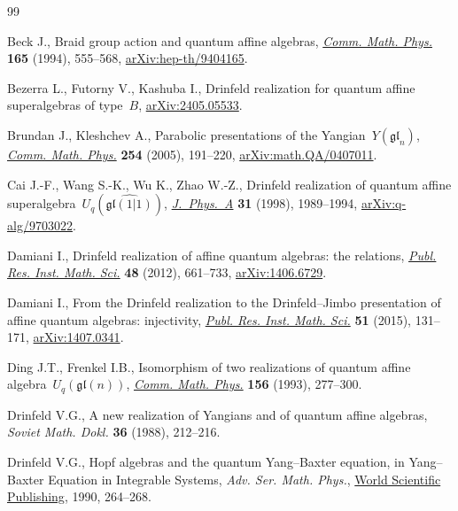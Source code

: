 \begin{thebibliography}{99}
\footnotesize\itemsep=0pt

Beck J., Braid group action and quantum affine algebras, \href{https://doi.org/10.1007/BF02099423}{\textit{Comm. Math.
 Phys.}} \textbf{165} (1994), 555--568, \href{https://arxiv.org/abs/hep-th/9404165}{arXiv:hep-th/9404165}.

Bezerra L., Futorny V., Kashuba I., Drinfeld realization for quantum affine
 superalgebras of type~{$B$}, \href{https://arxiv.org/abs/2405.05533}{arXiv:2405.05533}.

Brundan J., Kleshchev A., Parabolic presentations of the
 {Y}angian~{$Y({\mathfrak{gl}}_n)$}, \href{https://doi.org/10.1007/s00220-004-1249-6}{\textit{Comm. Math. Phys.}} \textbf{254}
 (2005), 191--220, \href{https://arxiv.org/abs/math.QA/0407011}{arXiv:math.QA/0407011}.

Cai J.-F., Wang S.-K., Wu K., Zhao W.-Z., Drinfeld realization of quantum affine
 superalgebra~{$U_q(\widehat{\mathfrak{gl}(1|1)})$}, \href{https://doi.org/10.1088/0305-4470/31/8/011}{\textit{J.~Phys.~A}}
 \textbf{31} (1998), 1989--1994, \href{https://arxiv.org/abs/q-alg/9703022}{arXiv:q-alg/9703022}.

Damiani I., Drinfeld realization of affine quantum algebras: the relations,
\href{https://doi.org/10.2977/PRIMS/86}{\textit{Publ. Res. Inst. Math. Sci.}} \textbf{48} (2012), 661--733,
 \href{https://arxiv.org/abs/1406.6729}{arXiv:1406.6729}.

Damiani I., From the {D}rinfeld realization to the {D}rinfeld--{J}imbo
 presentation of affine quantum algebras: injectivity, \href{https://doi.org/10.4171/PRIMS/150}{\textit{Publ. Res.
 Inst. Math. Sci.}} \textbf{51} (2015), 131--171, \href{https://arxiv.org/abs/1407.0341}{arXiv:1407.0341}.

Ding J.T., Frenkel I.B., Isomorphism of two realizations of quantum affine
 algebra~{$U_q(\mathfrak{gl}(n))$}, \href{https://doi.org/10.1007/bf02098484}{\textit{Comm. Math. Phys.}} \textbf{156}
 (1993), 277--300.

Drinfeld V.G., A new realization of {Y}angians and of quantum affine algebras,
 \textit{Soviet Math. Dokl.} \textbf{36} (1988), 212--216.

Drinfeld V.G., Hopf algebras and the quantum {Y}ang--{B}axter equation, in
 Yang--{B}axter {E}quation in {I}ntegrable {S}ystems, \textit{Adv. Ser. Math. Phys.},
 \href{https://doi.org/10.1142/9789812798336_0013}{World Scientific Publishing}, 1990, 264--268.


\end{thebibliography}
